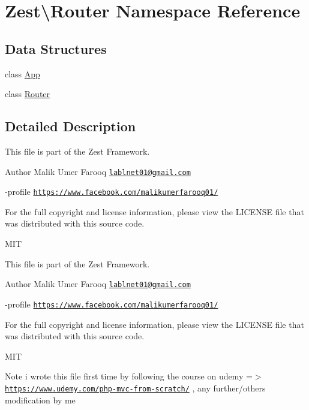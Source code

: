 \hypertarget{namespace_zest_1_1_router}{}\section{Zest\textbackslash{}Router Namespace Reference}
\label{namespace_zest_1_1_router}
\subsection*{Data Structures}
\begin{DoxyCompactItemize}
\item 
class \mbox{\hyperlink{class_zest_1_1_router_1_1_app}{App}}
\item 
class \mbox{\hyperlink{class_zest_1_1_router_1_1_router}{Router}}
\end{DoxyCompactItemize}


\subsection{Detailed Description}
This file is part of the Zest Framework.

\begin{DoxyAuthor}{Author}
Malik Umer Farooq \href{mailto:lablnet01@gmail.com}{\tt lablnet01@gmail.\+com} 

-\/profile \href{https://www.facebook.com/malikumerfarooq01/}{\tt https\+://www.\+facebook.\+com/malikumerfarooq01/}
\end{DoxyAuthor}
For the full copyright and license information, please view the L\+I\+C\+E\+N\+SE file that was distributed with this source code.

M\+IT

This file is part of the Zest Framework.

\begin{DoxyAuthor}{Author}
Malik Umer Farooq \href{mailto:lablnet01@gmail.com}{\tt lablnet01@gmail.\+com} 

-\/profile \href{https://www.facebook.com/malikumerfarooq01/}{\tt https\+://www.\+facebook.\+com/malikumerfarooq01/}
\end{DoxyAuthor}
For the full copyright and license information, please view the L\+I\+C\+E\+N\+SE file that was distributed with this source code.

M\+IT

\begin{DoxyNote}{Note}
i wrote this file first time by following the course on udemy =$>$ \href{https://www.udemy.com/php-mvc-from-scratch/}{\tt https\+://www.\+udemy.\+com/php-\/mvc-\/from-\/scratch/} , any further/others modification by me 
\end{DoxyNote}

